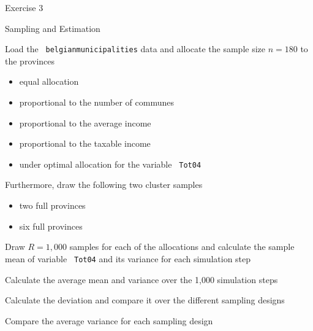 \documentclass[11pt,german,hideothersubsections]{beamer}
\newcommand{\R}[1]{{\tt \color{blue}  #1}}
\begin{document}
\begin{frame}[fragile]{Exercise 3}
\vspace{-.25cm}
\begin{exampleblock}{Sampling and Estimation}
\begin{enumerate}\footnotesize{
\item Load the \R{belgianmunicipalities} data and allocate the sample size \alert{$n=180$} to the provinces
\begin{itemize}
\item equal allocation
\item proportional to the number of communes 
\item proportional to the average income 
\item proportional to the taxable income 
\item under optimal allocation for the variable \R{Tot04}
\end{itemize}
\item Furthermore, draw the following two cluster samples
\begin{itemize}
\item two full provinces
\item six full provinces
\end{itemize}
\item Draw \alert{$R=1,000$} samples for each of the allocations and calculate the sample mean of variable \R{Tot04} and its variance for each simulation step
\item Calculate the average mean and variance over the 1,000 simulation steps
\item Calculate the deviation and compare it over the different sampling designs
\item Compare the average variance for each sampling design
}
\end{enumerate}
\end{exampleblock}

\end{frame}
\end{document}

